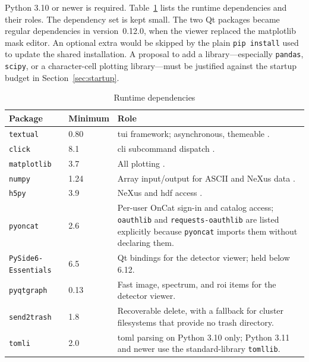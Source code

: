 \documentclass[tm]{ornltm}
\begin{document}
Python 3.10 or newer is required. Table~\ref{tab:deps} lists the runtime
dependencies and their roles. The dependency set is kept small. The two Qt
packages became regular dependencies in version~0.12.0, when the viewer replaced
the matplotlib mask editor. An optional extra would be skipped by the plain
\texttt{pip install} used to update the shared installation. A proposal to
add a library---especially \texttt{pandas}, \texttt{scipy}, or a character-cell
plotting library---must be justified against the startup budget in
Section~\ref{sec:startup}.

\begin{table}[ht]
  \centering
  \begin{threeparttable}
  \caption{Runtime dependencies}
  \label{tab:deps}
  \small
  \begin{tabular}{l l p{}}
    \toprule
    Package & Minimum & Role \\
    \midrule
    \texttt{textual}    & 0.80  & \Ac{tui} framework; asynchronous, themeable
      \autocite{textual}. \\
    \texttt{click}      & 8.1   & \Ac{cli} subcommand dispatch
      \autocite{click}. \\
    \texttt{matplotlib} & 3.7   & All plotting \autocite{matplotlib}. \\
    \texttt{numpy}      & 1.24  & Array input/output for ASCII and NeXus data
      \autocite{numpy}. \\
    \texttt{h5py}       & 3.9   & NeXus and \ac{hdf} access \autocite{h5py}. \\
    \texttt{pyoncat}    & 2.6   & Per-user OnCat sign-in and catalog access;
      \texttt{oauthlib} and \texttt{requests-oauthlib} are listed explicitly
      because \texttt{pyoncat} imports them without declaring them. \\
    \texttt{PySide6-Essentials} & 6.5 & Qt bindings for the detector viewer;
      held below 6.12.\tnote{a} \\
    \texttt{pyqtgraph}  & 0.13  & Fast image, spectrum, and \ac{roi} items for
      the detector viewer. \\
    \texttt{send2trash} & 1.8   & Recoverable delete, with a fallback for
      cluster filesystems that provide no trash directory. \\
    \texttt{tomli}      & 2.0   & \Ac{toml} parsing on Python 3.10 only;
      Python 3.11 and newer use the standard-library \texttt{tomllib}. \\
    \bottomrule
  \end{tabular}

\end{threeparttable}
\end{table}
\end{document}

